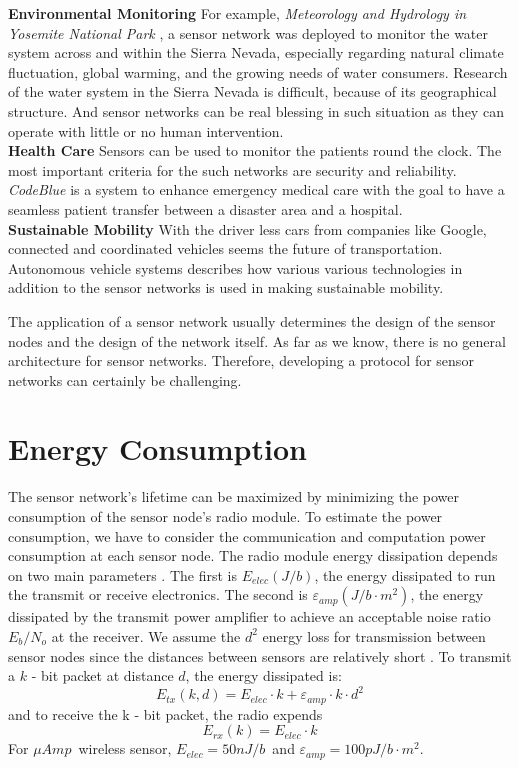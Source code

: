 	\textbf{Environmental Monitoring} 
	For example, \textit{Meteorology and Hydrology in Yosemite National Park} \cite{lundquist2003meteorology}, a sensor network was deployed to monitor the water system across and within the Sierra Nevada, especially regarding natural climate fluctuation, global warming, and the growing needs of water consumers.
	Research of the water system in the Sierra Nevada is difficult, because of its geographical structure.
	And sensor networks can be real blessing in such situation as they can operate with little or no human intervention.\\
	\textbf{Health Care} 
	Sensors can be used to monitor the patients round the clock. The most important criteria for the such networks are security and reliability.
	\textit{CodeBlue} \cite{lorincz2004sensor} is a system to enhance emergency medical care with the goal to have a seamless patient transfer between a disaster area and a hospital.\\
	\textbf{Sustainable Mobility} 
	With the driver less cars from companies like Google, connected and coordinated vehicles seems the future of transportation.
	Autonomous vehicle systems \cite{benenson2008towards} describes how various various technologies in addition to the sensor networks is used in making sustainable mobility. 

	The application of a sensor network usually determines the design of the sensor nodes and the design of the network itself.
	As far as we know, there is no general architecture for sensor networks.
	Therefore, developing a protocol for sensor networks can certainly be challenging. 

\section{Energy Consumption}
	The sensor network's lifetime can be maximized by minimizing the power consumption of the sensor node's radio module.
	To estimate the power consumption, we have to consider the communication and computation power consumption at each sensor node.
	The radio module energy dissipation depends on two main parameters \cite{wang2002energy}.
	The first is $E_{elec} (J/b)$, the energy dissipated to run the transmit or receive electronics.
	The second is $\varepsilon_{amp} (J/b \cdot m^2)$, the energy dissipated by the transmit power amplifier to achieve an acceptable noise ratio $E_{b} / N_{o} $ at the receiver.
	We assume the $d^2$ energy loss for transmission between sensor nodes since the distances between sensors are relatively short \cite{ettus1998system}. 
	To transmit a $k$ - bit packet at distance $d$, the energy dissipated is:
	\begin{equation}
		E_{tx}(k, d) = E_{elec} \cdot k + \varepsilon_{amp} \cdot k \cdot d^{2}
	\end{equation}
	and to receive the k - bit packet, the radio expends
	\begin{equation}
		E_{rx}(k) = E_{elec} \cdot k
	\end{equation}
	For $\mu Amp$\ wireless sensor, $E_{elec} = 50nJ/b$\ and $\varepsilon_{amp} = 100pJ/b \cdot m^2$.

